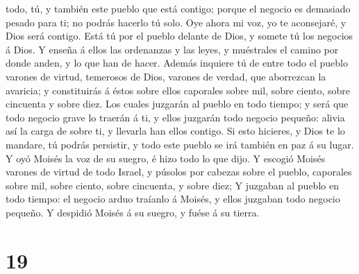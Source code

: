 todo, tú, y también este pueblo que está contigo; porque el negocio es
demasiado pesado para ti; no podrás hacerlo tú solo.  Oye
ahora mi voz, yo te aconsejaré, y Dios será contigo. Está tú por el
pueblo delante de Dios, y somete tú los negocios á Dios.  Y
enseña á ellos las ordenanzas y las leyes, y muéstrales el camino por
donde anden, y lo que han de hacer.  Además inquiere tú de
entre todo el pueblo varones de virtud, temerosos de Dios, varones de
verdad, que aborrezcan la avaricia; y constituirás á éstos sobre ellos
caporales sobre mil, sobre ciento, sobre cincuenta y sobre diez.
 Los cuales juzgarán al pueblo en todo tiempo; y será que
todo negocio grave lo traerán á ti, y ellos juzgarán todo negocio
pequeño: alivia así la carga de sobre ti, y llevarla han ellos contigo.
 Si esto hicieres, y Dios te lo mandare, tú podrás
persistir, y todo este pueblo se irá también en paz á su lugar.
 Y oyó Moisés la voz de su suegro, é hizo todo lo que dijo.
 Y escogió Moisés varones de virtud de todo Israel, y
púsolos por cabezas sobre el pueblo, caporales sobre mil, sobre ciento,
sobre cincuenta, y sobre diez;  Y juzgaban al pueblo en
todo tiempo: el negocio arduo traíanlo á Moisés, y ellos juzgaban todo
negocio pequeño.  Y despidió Moisés á su suegro, y fuése á
su tierra.

\hypertarget{section-18}{%
\section{19}\label{section-18}}


